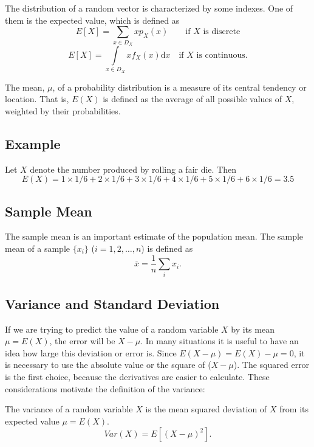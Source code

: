 \documentclass[
  letterpaper,
  DIV=11,
  numbers=noendperiod]{scrreprt}
\begin{document}
The distribution of a random vector is characterized by some indexes.
One of them is the expected value, which is defined as \[
E[X] = \sum_{x \in D_X} xp_X(x)  \qquad \text{if $X$ is discrete}
\] \[
E[X] = \int\limits_{x \in D_X} xf_X(x)\mathrm{d}x  \quad  \text{if $X$ is continuous.}
\]

The mean, \(\mu\), of a probability distribution is a measure of its
central tendency or location. That is, \(E(X)\) is defined as the
average of all possible values of \(X\), weighted by their
probabilities.

\hypertarget{example}{%
\subsection{Example}\label{example}}

Let \(X\) denote the number produced by rolling a fair die. Then \[
E(X) = 1 \times 1/6 + 2 \times 1/6 + 3 \times 1/6 + 4 \times 1/6 + 5 \times 1/6 + 6\times 1/6 = 3.5 
\]

\hypertarget{sample-mean}{%
\subsection{Sample Mean}\label{sample-mean}}

The sample mean is an important estimate of the population mean. The
sample mean of a sample \(\{x_i\}\) (\(i=1,2,\ldots,n\)) is defined as
\[\overline{x}  = \frac{1}{n} \sum_i x_i.\]

\hypertarget{variance-and-standard-deviation}{%
\subsection{Variance and Standard
Deviation}\label{variance-and-standard-deviation}}

If we are trying to predict the value of a random variable \(X\) by its
mean \(\mu = E(X)\), the error will be \(X-\mu\). In many situations it
is useful to have an idea how large this deviation or error is. Since
\(E(X-\mu) = E(X) -\mu = 0\), it is necessary to use the absolute value
or the square of (\(X-\mu\)). The squared error is the first choice,
because the derivatives are easier to calculate. These considerations
motivate the definition of the variance:

The variance of a random variable \(X\) is the mean squared deviation of
\(X\) from its expected value \(\mu = E(X)\). \begin{equation}
Var(X) = E[ (X-\mu)^2].
\end{equation}
\end{document}
